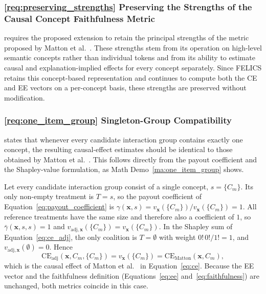 \subsubsection{\ref{req:preserving_strengths} Preserving the Strengths of the Causal Concept Faithfulness Metric}

 requires the proposed extension to retain the principal strengths of the metric proposed by Matton et al.~\cite{mattonWalkTalkMeasuring2024}. These strengths stem from its operation on high-level semantic concepts rather than individual tokens and from its ability to estimate causal and explanation-implied effects for every concept separately. Since FELICS retains this concept-based representation and continues to compute both the CE and EE vectors on a per-concept basis, these strengths are preserved without modification.

\subsubsection{\ref{req:one_item_group} Singleton-Group Compatibility}

 states that whenever every candidate interaction group contains exactly one concept, the resulting causal-effect estimates should be identical to those obtained by Matton et al.~\cite{mattonWalkTalkMeasuring2024}. This follows directly from the payout coefficient and the Shapley-value formulation, as Math Demo~\ref{ma:one_item_group} shows.

\begin{math_box}[label=ma:one_item_group]
	Let every candidate interaction group consist of a single concept, $s=\{C_m\}$. Its only non-empty treatment is $T=s$, so the payout coefficient of Equation~\ref{eq:payout_coefficient} is $\gamma(\mathbf{x},s)=v_{\mathbf{x}}(\{C_m\})/v_{\mathbf{x}}(\{C_m\})=1$. All reference treatments have the same size and therefore also a coefficient of $1$, so $\bar\gamma(\mathbf{x},s,s)=1$ and $v_{\mathrm{adj},\mathbf{x}}(\{C_m\})=v_{\mathbf{x}}(\{C_m\})$. In the Shapley sum of Equation~\ref{eq:ce_adj}, the only coalition is $T=\emptyset$ with weight $0!\,0!/1!=1$, and $v_{\mathrm{adj},\mathbf{x}}(\emptyset)=0$. Hence
	\begin{equation}
		\mathrm{CE}_{\mathrm{adj}}(\mathbf{x},C_m,\{C_m\})
		=
		v_{\mathbf{x}}(\{C_m\})
		=
		\mathrm{CE}_{\mathrm{Matton}}(\mathbf{x},C_m),
	\end{equation}
	which is the causal effect of Matton et al.~\cite{mattonWalkTalkMeasuring2024} in Equation~\ref{eq:ce}. Because the EE vector and the faithfulness definition (Equations~\ref{eq:ee} and~\ref{eq:faithfulness}) are unchanged, both metrics coincide in this case.
\end{math_box}

